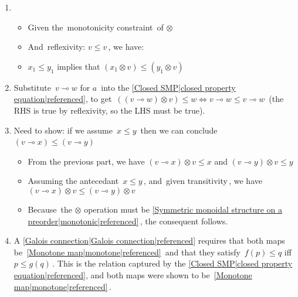 \begin{enumerate}
    \item
          \begin{itemize}
            \item Given the \,monotonicity constraint\, of $\otimes$
            \item And \,reflexivity: $v \leq v$\,, we have:
            \item $x_1 \leq y_1$ implies that $(x_1 \otimes v) \leq (y_1 \otimes v)$
          \end{itemize}
    \item Substitute \,$v \multimap w$ for $a$\, into the \ref{Closed SMP|closed property equation|referenced}, to get \,$((v \multimap w)\otimes v) \leq w \iff v \multimap w \leq v \multimap w$\, (the RHS is true by reflexivity, so the LHS must be true).
    \item Need to show: if we assume \,$x \leq y$\, then we can conclude \,$(v \multimap x) \leq (v \multimap y)$\,
          \begin{itemize}
            \item From the previous part, we have $(v \multimap x) \otimes v \leq x$ and $(v \multimap y) \otimes v \leq y$
            \item Assuming the antecedant \,$x \leq y$\,, and \,given transitivity\,, we have $(v \multimap x) \otimes v \leq (v \multimap y) \otimes v$
            \item Because \,the $\otimes$ operation must be \ref{Symmetric monoidal structure on a preorder|monotonic|referenced}\,, the consequent follows.
          \end{itemize}
    \item A \ref{Galois connection|Galois connection|referenced} requires that both maps be \,\ref{Monotone map|monotone|referenced}\, and that they satisfy \,$f(p)\leq q$ iff $p \leq g(q)$\,. This is the relation captured by the \ref{Closed SMP|closed property equation|referenced}, and both maps were shown to be \,\ref{Monotone map|monotone|referenced}\,.
  \end{enumerate}
